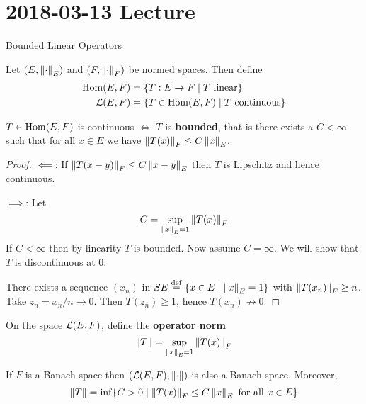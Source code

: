 \section{2018-03-13 Lecture}

Bounded Linear Operators

\begin{defn}
	Let $(E,\left\lVert \cdot \right\rVert_E)$ and $(F,\left\lVert \cdot \right\rVert_F)$ be normed spaces.
	Then define
	\begin{align*}
		\operatorname{Hom}(E,F) &= \{T:E \to F \mid T \text{ linear}\} \\
		\mathcal{L}(E,F) &= \{T \in \operatorname{Hom}(E,F) \mid T \text{ continuous}\}
	\end{align*}
\end{defn}

\begin{lem}
	$T \in \operatorname{Hom}(E,F)$ is continuous $\iff$ $T$ is \textbf{bounded}, that is there exists a $C<\infty$ such that for all $x \in E$ we have $\left\lVert T(x) \right\rVert_F \leq C\left\lVert x \right\rVert_E$.
\end{lem}

\begin{proof}
	$\impliedby$: If $\left\lVert T(x-y) \right\rVert_F \leq C \left\lVert x-y \right\rVert_E$ then $T$ is Lipschitz and hence continuous.
	
	$\implies$: Let 
	\[C = \sup_{\left\lVert x \right\rVert_E=1} \left\lVert T(x) \right\rVert_F\]
	If $C<\infty$ then by linearity $T$ is bounded.
	Now assume $C=\infty$.
	We will show that $T$ is discontinuous at $0$.
	
	There exists a sequence $(x_n)$ in $SE \overset{\mathrm{def}}{=} \{x \in E \mid \left\lVert x \right\rVert_E = 1\}$ with $\left\lVert T(x_n) \right\rVert_F \geq n$.
	Take $z_n=x_n/n \to 0$.
	Then $T(z_n) \geq 1$, hence $T(x_n) \not\to 0$.
\end{proof}

\begin{defn}
	On the space $\mathcal{L}(E,F)$, define the \textbf{operator norm}
	\[\left\lVert T \right\rVert = \sup_{\left\lVert x \right\rVert_E=1} \left\lVert T(x) \right\rVert_F\]
\end{defn}

\begin{lem}
	If $F$ is a Banach space then $(\mathcal{L}(E,F),\left\lVert \cdot \right\rVert)$ is also a Banach space.
	Moreover,
	\[\left\lVert T \right\rVert = \inf\{C>0 \mid \left\lVert T(x) \right\rVert_F \leq C\left\lVert x \right\rVert_E \text{ for all } x \in E\}\]
\end{lem}

